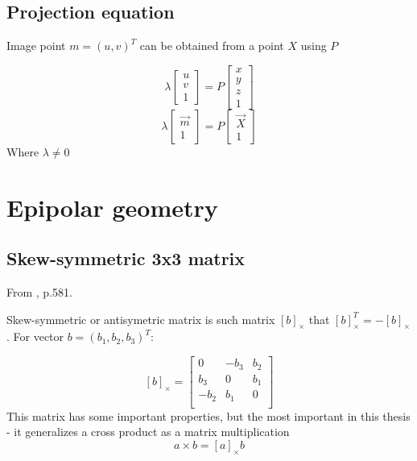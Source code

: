 \subsection{Projection equation}

Image point $m = (u, v)^T$ can be obtained from a point $X$ using $P$ 

$$
\lambda \begin{bmatrix} 
    u \\ v \\ 1 \end{bmatrix} = P \begin{bmatrix} x \\ y \\ z \\ 1
\end{bmatrix}
$$
$$
\lambda \begin{bmatrix} 
    \vec{m} \\ 1 \end{bmatrix} = P \begin{bmatrix} \vec{X} \\ 1
    \end{bmatrix}
$$
Where $\lambda \neq 0$

\section{Epipolar geometry}

\subsection{Skew-symmetric 3x3 matrix}
From \cite{hartley_zisserman_2004}, p.581.


Skew-symmetric or antisymetric matrix is such matrix $[b]_{\times}$ that $[b]_{\times}^T = -[b]_{\times}$. 
For vector $b = (b_1, b_2, b_3)^T$:

$$
[b]_{\times} = \begin{bmatrix}
    0 & -b_3 & b_2 \\ 
    b_3 & 0 & b_1 \\ 
    -b_2 & b_1 & 0 \\ 
\end{bmatrix}
$$
This matrix has some important properties, but the most important in this thesis - it generalizes a cross product as a matrix multiplication
$$
a \times b = [a]_{\times} b
$$


